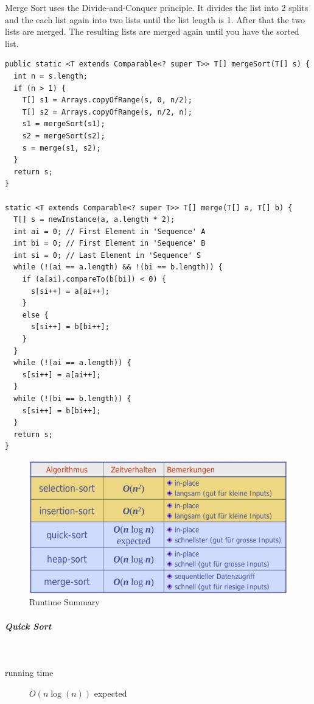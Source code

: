 \documentclass[11pt,twoside,twocolumn,landscape]{article}
\begin{document}
Merge Sort uses the Divide-and-Conquer principle.
It divides the list into 2 splits and the each list again into two lists until the list length is 1.
After that the two lists are merged.
The resulting lists are merged again until you have the sorted list.
\lstset{language=java,label= ,caption= ,captionpos=b,numbers=none}
\begin{lstlisting}
public static <T extends Comparable<? super T>> T[] mergeSort(T[] s) {  
  int n = s.length;
  if (n > 1) {
    T[] s1 = Arrays.copyOfRange(s, 0, n/2);
    T[] s2 = Arrays.copyOfRange(s, n/2, n);
    s1 = mergeSort(s1);
    s2 = mergeSort(s2);
    s = merge(s1, s2);
  }
  return s;
}

static <T extends Comparable<? super T>> T[] merge(T[] a, T[] b) {
  T[] s = newInstance(a, a.length * 2);
  int ai = 0; // First Element in 'Sequence' A
  int bi = 0; // First Element in 'Sequence' B
  int si = 0; // Last Element in 'Sequence' S
  while (!(ai == a.length) && !(bi == b.length)) {
    if (a[ai].compareTo(b[bi]) < 0) {
      s[si++] = a[ai++];
    }
    else {
      s[si++] = b[bi++];
    }
  }
  while (!(ai == a.length)) {
    s[si++] = a[ai++];
  }
  while (!(bi == b.length)) {
    s[si++] = b[bi++];
  }
  return s;
}
\end{lstlisting}

\begin{figure}[htbp]
\centering
\includegraphics[width=.9\linewidth]{img/sort_algorithm_summary_runtime.png}
\caption{\label{fig:orgb11d950}Runtime Summary}
\end{figure}

\subparagraph{Quick Sort} \
\label{sec:orgfa3af0b}

\begin{description}
\item[{running time}] \(O(n \log(n))\) expected
\end{description}
\end{document}
